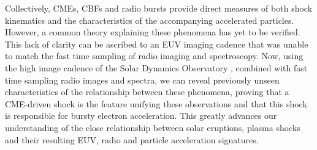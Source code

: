 Collectively, CMEs, CBFs and radio bursts provide direct measures of both shock kinematics and the characteristics of the accompanying accelerated particles. However, a common theory explaining these phenomena has yet to be verified.
This lack of clarity can be ascribed to an EUV imaging cadence that was unable to match the fast time sampling of radio imaging and spectroscopy. Now, using the high image cadence of the Solar Dynamics Observatory \citep[SDO;][]{presnell2012}, combined with fast time sampling radio images and spectra, we can reveal previously unseen characteristics of the relationship between these phenomena, proving that a CME-driven shock is the feature unifying these observations and that this shock is responsible for bursty electron acceleration. This greatly advances our understanding of the close relationship between solar eruptions, plasma shocks and their resulting EUV, radio and particle acceleration signatures.


